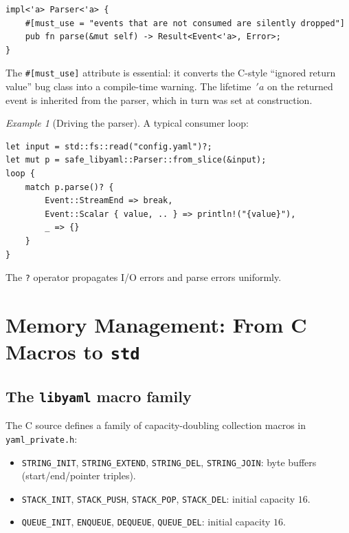 \documentclass[12pt]{article}
\theoremstyle{definition}
\theoremstyle{remark}
\newtheorem*{example}{Example}
\newcommand{\lifetime}[1]{\ensuremath{\,'\!#1}}
\begin{document}
\begin{lstlisting}
impl<'a> Parser<'a> {
    #[must_use = "events that are not consumed are silently dropped"]
    pub fn parse(&mut self) -> Result<Event<'a>, Error>;
}
\end{lstlisting}

The \texttt{\#[must\_use]} attribute is essential: it converts the C-style
``ignored return value'' bug class into a compile-time warning. The lifetime
$\lifetime{a}$ on the returned event is inherited from the parser, which in
turn was set at construction.

\begin{example}[Driving the parser]
A typical consumer loop:
\begin{lstlisting}
let input = std::fs::read("config.yaml")?;
let mut p = safe_libyaml::Parser::from_slice(&input);
loop {
    match p.parse()? {
        Event::StreamEnd => break,
        Event::Scalar { value, .. } => println!("{value}"),
        _ => {}
    }
}
\end{lstlisting}
The \texttt{?} operator propagates I/O errors and parse errors uniformly.
\end{example}

\section[Memory Management]{Memory Management: From C Macros to \texttt{std}}
\label{sec:memory}

\subsection{The \texttt{libyaml} macro family}

The C source defines a family of capacity-doubling collection macros in
\texttt{yaml\_private.h}:

\begin{itemize}[leftmargin=2em]
\item \texttt{STRING\_INIT}, \texttt{STRING\_EXTEND},
\texttt{STRING\_\allowbreak DEL}, \texttt{STRING\_JOIN}: byte buffers
(start/end/pointer triples).
\item \texttt{STACK\_INIT}, \texttt{STACK\_PUSH}, \texttt{STACK\_POP},
\texttt{STACK\_DEL}: initial capacity $16$.
\item \texttt{QUEUE\_INIT}, \texttt{ENQUEUE}, \texttt{DEQUEUE},
\texttt{QUEUE\_DEL}: initial capacity $16$.
\end{itemize}
\end{document}
